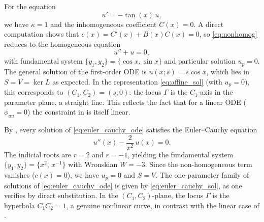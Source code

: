 \documentclass[preprint,a4paper]{elsarticle}
\begin{document}
\begin{example}\label{ex:linear_embedding}
For the equation 
$$
u'=-\tan(x)\,u,
$$we have $\kappa=1$ and the inhomogeneous coefficient $C(x)=0$. A direct computation shows that $c(x)=C'(x)+B(x)C(x)=0$, so \eqref{eq:nonhomog} reduces to the homogeneous equation
\[
u''+u=0,
\]
with fundamental system $\{y_1,y_2\}=\{\cos x,\sin x\}$ and particular solution $u_p=0$. The general solution of the first-order ODE is $u(x;s)=s\cos x$, which lies in $S=V=\ker L$ as expected. In the representation \eqref{eq:affine_sol} (with $u_p=0$), this corresponds to $(C_1,C_2)=(s,0)$: the locus $\Gamma$ is the $C_1$-axis in the parameter plane, a straight line. This reflects the fact that for a linear ODE ($\phi_{uu}=0$) the constraint in  is itself linear.
\end{example}

\begin{example}\label{ex:euler_cauchy_embedding}
By , every solution of \eqref{eq:euler_cauchy_ode} satisfies the Euler--Cauchy equation
\begin{equation}\label{eq:euler_cauchy_2nd}
u''(x)-\frac{2}{x^2}\,u(x) = 0.
\end{equation}
The indicial roots are $r=2$ and $r=-1$, yielding the fundamental system $\{y_1,y_2\}=\{x^2,\,x^{-1}\}$ with Wronskian $W=-3$. Since the non-homogeneous term vanishes ($c(x)=0$), we have $u_p=0$ and $S=V$. The one-parameter family of solutions of \eqref{eq:euler_cauchy_ode} is given by \eqref{eq:euler_cauchy_sol}, as one verifies by direct substitution. In the $(C_1,C_2)$-plane, the locus $\Gamma$ is the hyperbola $C_1 C_2=1$, a genuine nonlinear curve, in contrast with the linear case of .
\end{example}


\end{document}
